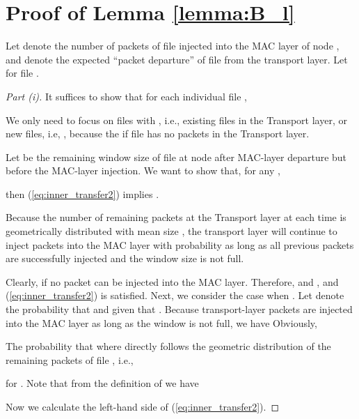 \documentclass[10pt,onecolumn,draftclsnofoot,journal]{IEEEtran}
\begin{document}
\appendices
\section{Proof of Lemma \ref{lemma:B_l}}
Let  denote the number of packets of file  injected into the MAC layer of node , and  denote the expected ``packet departure'' of file  from the transport layer. Let  for file .
\begin{proof}[Part (i)]
It suffices to show that for each individual file ,

We only need to focus on files  with , i.e., existing files in the Transport layer, or new files, i.e, , because the  if file  has no packets in the Transport layer.

Let  be the remaining window size of file  at node  after MAC-layer departure but before the MAC-layer injection. We want to show that, for any ,

then (\ref{eq:inner_transfer2}) implies .

Because the number of remaining packets at the Transport layer at each time is geometrically distributed with mean size , the transport layer will continue to inject packets into the MAC layer with probability  as long as all previous packets are successfully injected and the window size is not full.

Clearly, if  no packet can be injected into the MAC layer. Therefore,  and , and (\ref{eq:inner_transfer2}) is satisfied. Next, we consider the case when .
Let  denote the probability that  and  given that . Because transport-layer packets are injected into the MAC layer as long as the window is not full, we have  Obviously, 

The probability that  where  directly follows the geometric distribution of the remaining packets of file , i.e.,

for .
Note that from the definition of  we have


Now we calculate the left-hand side of (\ref{eq:inner_transfer2}).

\end{proof}
\end{document}
